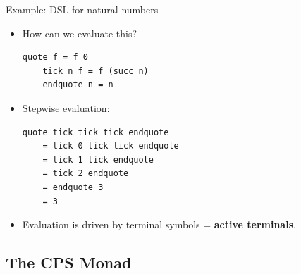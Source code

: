 \documentclass[10pt]{beamer}
\begin{document}
\begin{frame}[fragile]{Example: DSL for natural numbers}

\begin{itemize}

\begin{lstlisting}[mathescape=true]
	(((quote tick) tick) tick) endquote
\end{lstlisting}

\item How can we evaluate this?

\begin{lstlisting}[mathescape=true]
	quote f = f 0
	tick n f = f (succ n)
	endquote n = n
\end{lstlisting}

\item Stepwise evaluation:

\begin{lstlisting}[mathescape=true]
	quote tick tick tick endquote
	= tick 0 tick tick endquote
	= tick 1 tick endquote
	= tick 2 endquote
	= endquote 3
	= 3
\end{lstlisting}

\item Evaluation is driven by terminal symbols = \textbf{active terminals}.

\end{itemize}

\end{frame}

\subsection{The CPS Monad}
\end{document}
